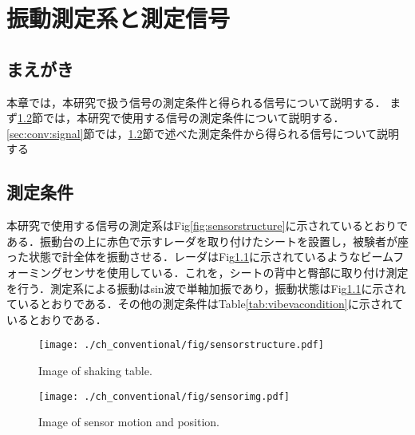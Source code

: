 \chapter{振動測定系と測定信号}
\label{chap:conv}

\section{まえがき}
本章では，本研究で扱う信号の測定条件と得られる信号について説明する．
まず\ref{sec:conv:measurementcondition}節では，本研究で使用する信号の測定条件について説明する．
\ref{sec:conv:signal}節では，\ref{sec:conv:measurementcondition}節で述べた測定条件から得られる信号について説明する

\section{測定条件}
\label{sec:conv:measurementcondition}
本研究で使用する信号の測定系はFig\ref{fig:sensorstructure}に示されているとおりである．振動台の上に赤色で示すレーダを取り付けたシートを設置し，被験者が座った状態で計全体を振動させる．レーダはFig\ref{fig:sensorimg}に示されているようなビームフォーミングセンサを使用している．これを，シートの背中と臀部に取り付け測定を行う．測定系による振動はsin波で単軸加振であり，振動状態はFig\ref{fig:sensorimg}に示されているとおりである．その他の測定条件はTable\ref{tab:vibevacondition}に示されているとおりである．

\begin{figure}[htbp]
 \begin{minipage}{0.5\hsize}
  \begin{center}
   \texttt{[image: ./ch\_conventional/fig/sensorstructure.pdf]}
  \end{center}
  \caption{Image of shaking table.}
  \label{fig:sensorstructure}
 \end{minipage}
 \begin{minipage}{0.5\hsize}
  \begin{center}
   \texttt{[image: ./ch\_conventional/fig/sensorimg.pdf]}
  \end{center}
  \caption{Image of sensor motion and position.}
  \label{fig:sensorimg}
 \end{minipage}
\end{figure}

